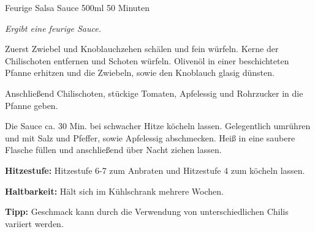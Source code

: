 \documentclass[
  DIV=11,%
  pagesize,%
  fontsize=11pt,%
  paper=a4,%
]{scrartcl}
\begin{document}
\begin{recipe}{Feurige Salsa Sauce} {500ml} {50 Minuten}

\freeform
\textit{Ergibt eine feurige Sauce.}


Zuerst Zwiebel und Knoblauchzehen schälen und fein würfeln.
Kerne der Chilischoten entfernen und Schoten würfeln.
Olivenöl in einer beschichteten Pfanne erhitzen und die Zwiebeln, sowie den Knoblauch glasig dünsten.


Anschließend Chilischoten, stückige Tomaten, Apfelessig und Rohrzucker in die Pfanne geben.


Die Sauce ca. 30 Min. bei schwacher Hitze köcheln lassen.
Gelegentlich umrühren und mit Salz und Pfeffer, sowie Apfelessig abschmecken.
Heiß in eine saubere Flasche füllen und anschließend über Nacht ziehen lassen.

\freeform
\hrulefill

\freeform
\textbf{Hitzestufe:}
Hitzestufe 6-7 zum Anbraten und Hitzestufe 4 zum köcheln lassen.

\freeform 
\textbf{Haltbarkeit:}
Hält sich im Kühlschrank mehrere Wochen.

\freeform 
\textbf{Tipp:}
Geschmack kann durch die Verwendung von unterschiedlichen Chilis variiert werden.

\end{recipe}
\end{document}
